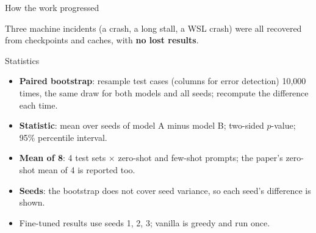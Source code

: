 \documentclass[11pt,aspectratio=169]{beamer}
\begin{document}
\begin{frame}{How the work progressed}
\vspace{0.2cm}
\begin{center}
\end{center}
\vspace{0.4cm}
\begin{tscallout}[tspanel]\small Three machine incidents (a crash, a long stall, a WSL crash) were all recovered from checkpoints and caches, with \textbf{no lost results}.\end{tscallout}
\end{frame}

\begin{frame}{Statistics}
\begin{itemize}\small\setlength{\itemsep}{4pt}
\item \textbf{Paired bootstrap}: resample test cases (columns for error detection) 10,000 times, the same draw for both models and all seeds; recompute the difference each time.
\item \textbf{Statistic}: mean over seeds of model A minus model B; two-sided $p$-value; 95\% percentile interval.
\item \textbf{Mean of 8}: 4 test sets $\times$ zero-shot and few-shot prompts; the paper's zero-shot mean of 4 is reported too.
\item \textbf{Seeds}: the bootstrap does not cover seed variance, so each seed's difference is shown.
\item Fine-tuned results use seeds 1, 2, 3; vanilla is greedy and run once.
\end{itemize}
\end{frame}
\end{document}
